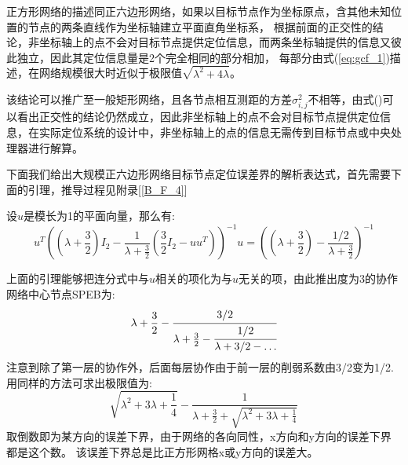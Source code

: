 正方形网络的描述同正六边形网络，如果以目标节点作为坐标原点，含其他未知位置的节点的两条直线作为坐标轴建立平面直角坐标系，
根据前面的正交性的结论，非坐标轴上的点不会对目标节点提供定位信息，而两条坐标轴提供的信息又彼此独立，因此其定位信息量是2个完全相同的部分相加，
每部分由式(\ref{eq:gcf_1})描述，在网络规模很大时近似于极限值$\sqrt{\lambda^2+4\lambda}$。

该结论可以推广至一般矩形网络，且各节点相互测距的方差$\sigma^2_{i,j}$不相等，由式(\label{eq:recursive_efim_second})可以看出正交性的结论仍然成立，因此非坐标轴上的点不会对目标节点提供定位信息，在实际定位系统的设计中，非坐标轴上的点的信息无需传到目标节点或中央处理器进行解算。

下面我们给出大规模正六边形网络目标节点定位误差界的解析表达式，首先需要下面的引理，推导过程见附录[\ref{B_F_4}]
\begin{lemma}\label{lemma:hexagon}
  设$u$是模长为1的平面向量，那么有:
\begin{equation}\label{eq:equiv}
  u^T((\lambda+\frac{3}{2})I_2-\frac{1}{\lambda+\frac{3}{2}}(\frac{3}{2}I_2-uu^T))^{-1}u
  =((\lambda+\frac{3}{2})-\frac{1/2}{\lambda+\frac{3}{2}})^{-1}
\end{equation}
\end{lemma}
  上面的引理能够把连分式中与$u$相关的项化为与$u$无关的项，由此推出度为3的协作网络中心节点SPEB为:
  \[
\lambda+\frac{3}{2}-\cfrac{3/2}{\lambda+\frac{3}{2}-\cfrac{1/2}{\lambda+3/2-\dots}}
  \]
  注意到除了第一层的协作外，后面每层协作由于前一层的削弱系数由3/2变为1/2.
  用同样的方法可求出极限值为:
  \[
  \sqrt{\lambda^2+3\lambda+\frac{1}{4}}-\frac{1}{\lambda+\frac{3}{2}+\sqrt{\lambda^2+3\lambda+\frac{1}{4}}}
  \]
  取倒数即为某方向的误差下界，由于网络的各向同性，x方向和y方向的误差下界都是这个数。
该误差下界总是比正方形网格x或y方向的误差大。

